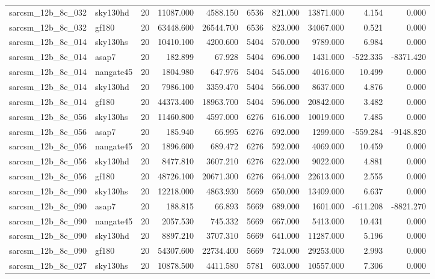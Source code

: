 \begin{longtable}{llrrrrrrrr}
sarcsm\_12b\_8c\_032 & sky130hd & 20 & 11087.000 & 4588.150 & 6536 & 821.000 & 13871.000 & 4.154 & 0.000 \\
sarcsm\_12b\_8c\_032 & gf180 & 20 & 63448.600 & 26544.700 & 6536 & 823.000 & 34067.000 & 0.521 & 0.000 \\
sarcsm\_12b\_8c\_014 & sky130hs & 20 & 10410.100 & 4200.600 & 5404 & 570.000 & 9789.000 & 6.984 & 0.000 \\
sarcsm\_12b\_8c\_014 & asap7 & 20 & 182.899 & 67.928 & 5404 & 696.000 & 1431.000 & -522.335 & -8371.420 \\
sarcsm\_12b\_8c\_014 & nangate45 & 20 & 1804.980 & 647.976 & 5404 & 545.000 & 4016.000 & 10.499 & 0.000 \\
sarcsm\_12b\_8c\_014 & sky130hd & 20 & 7986.100 & 3359.470 & 5404 & 566.000 & 8637.000 & 4.876 & 0.000 \\
sarcsm\_12b\_8c\_014 & gf180 & 20 & 44373.400 & 18963.700 & 5404 & 596.000 & 20842.000 & 3.482 & 0.000 \\
sarcsm\_12b\_8c\_056 & sky130hs & 20 & 11460.800 & 4597.000 & 6276 & 616.000 & 10019.000 & 7.485 & 0.000 \\
sarcsm\_12b\_8c\_056 & asap7 & 20 & 185.940 & 66.995 & 6276 & 692.000 & 1299.000 & -559.284 & -9148.820 \\
sarcsm\_12b\_8c\_056 & nangate45 & 20 & 1896.600 & 689.472 & 6276 & 592.000 & 4069.000 & 10.459 & 0.000 \\
sarcsm\_12b\_8c\_056 & sky130hd & 20 & 8477.810 & 3607.210 & 6276 & 622.000 & 9022.000 & 4.881 & 0.000 \\
sarcsm\_12b\_8c\_056 & gf180 & 20 & 48726.100 & 20671.300 & 6276 & 664.000 & 22613.000 & 2.555 & 0.000 \\
sarcsm\_12b\_8c\_090 & sky130hs & 20 & 12218.000 & 4863.930 & 5669 & 650.000 & 13409.000 & 6.637 & 0.000 \\
sarcsm\_12b\_8c\_090 & asap7 & 20 & 188.815 & 66.893 & 5669 & 689.000 & 1601.000 & -611.208 & -8821.270 \\
sarcsm\_12b\_8c\_090 & nangate45 & 20 & 2057.530 & 745.332 & 5669 & 667.000 & 5413.000 & 10.431 & 0.000 \\
sarcsm\_12b\_8c\_090 & sky130hd & 20 & 8897.210 & 3707.310 & 5669 & 641.000 & 11287.000 & 5.196 & 0.000 \\
sarcsm\_12b\_8c\_090 & gf180 & 20 & 54307.600 & 22734.400 & 5669 & 724.000 & 29253.000 & 2.993 & 0.000 \\
sarcsm\_12b\_8c\_027 & sky130hs & 20 & 10878.500 & 4411.580 & 5781 & 603.000 & 10557.000 & 7.306 & 0.000 \\

\end{longtable}
